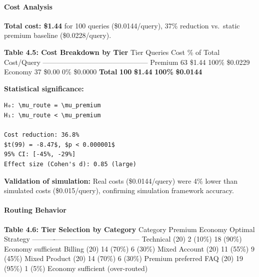 \documentclass[
  11pt,
]{article}
\begin{document}
\hypertarget{cost-analysis-2}{%
\paragraph{Cost Analysis}\label{cost-analysis-2}}

\textbf{Total cost: \$1.44} for 100 queries (\$0.0144/query), 37\%
reduction vs.~static premium baseline (\$0.0228/query).

\textbf{Table 4.5: Cost Breakdown by Tier} \textbar{} Tier \textbar{}
Queries \textbar{} Cost \textbar{} \% of Total \textbar{} Cost/Query
\textbar{}
\textbar------\textbar---------\textbar------\textbar------------\textbar------------\textbar{}
\textbar{} Premium \textbar{} 63 \textbar{} \$1.44 \textbar{} 100\%
\textbar{} \$0.0229 \textbar{} \textbar{} Economy \textbar{} 37
\textbar{} \$0.00 \textbar{} 0\% \textbar{} \$0.0000 \textbar{}
\textbar{} \textbf{Total} \textbar{} \textbf{100} \textbar{}
\textbf{\$1.44} \textbar{} \textbf{100\%} \textbar{} \textbf{\$0.0144}
\textbar{}

\textbf{Statistical significance:}

\begin{verbatim}
H₀: \mu_route = \mu_premium
H₁: \mu_route < \mu_premium

Cost reduction: 36.8%
$t(99) = -8.47$, $p < 0.000001$
95% CI: [-45%, -29%]
Effect size (Cohen's d): 0.85 (large)
\end{verbatim}

\textbf{Validation of simulation:} Real costs (\$0.0144/query) were 4\%
lower than simulated costs (\$0.015/query), confirming simulation
framework accuracy.

\hypertarget{routing-behavior}{%
\paragraph{Routing Behavior}\label{routing-behavior}}

\textbf{Table 4.6: Tier Selection by Category} \textbar{} Category
\textbar{} Premium \textbar{} Economy \textbar{} Optimal Strategy
\textbar{}
\textbar----------\textbar---------\textbar---------\textbar------------------\textbar{}
\textbar{} Technical (20) \textbar{} 2 (10\%) \textbar{} 18 (90\%)
\textbar{} Economy sufficient \textbar{} \textbar{} Billing (20)
\textbar{} 14 (70\%) \textbar{} 6 (30\%) \textbar{} Mixed \textbar{}
\textbar{} Account (20) \textbar{} 11 (55\%) \textbar{} 9 (45\%)
\textbar{} Mixed \textbar{} \textbar{} Product (20) \textbar{} 14 (70\%)
\textbar{} 6 (30\%) \textbar{} Premium preferred \textbar{} \textbar{}
FAQ (20) \textbar{} 19 (95\%) \textbar{} 1 (5\%) \textbar{} Economy
sufficient (over-routed) \textbar{}
\end{document}
